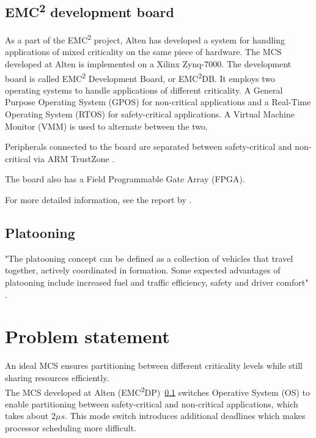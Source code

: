 \subsection{EMC\textsuperscript{2} development board}
\label{sec:mces}
As a part of the EMC\textsuperscript{2} project, Alten has developed a system for handling applications of mixed criticality on the same piece of hardware. The MCS developed at Alten is implemented on a Xilinx Zynq-7000. The development board is called EMC\textsuperscript{2} Development Board, or EMC\textsuperscript{2}DB. It employs two operating systems to handle applications of different criticality. A General Purpose Operating System (GPOS) for non-critical applications and a Real-Time Operating System (RTOS) for safety-critical applications. A Virtual Machine Monitor (VMM) is used to alternate between the two. %

Peripherals connected to the board are separated between safety-critical and non-critical via ARM TrustZone \cite{website:ARM}.

The board also has a Field Programmable Gate Array (FPGA).


For more detailed information, see the report by \cite{zaki2016}.

\subsection{Platooning}
\label{sec:platooning}
"The platooning concept can be defined as a collection of  vehicles that travel together, actively coordinated in formation. Some expected advantages of platooning include increased fuel and traffic  efficiency, safety and driver  comfort" \cite{bergenhem}.

\section{Problem statement}
\label{sec:problem}
An ideal MCS ensures partitioning between different criticality levels while still sharing resources efficiently.\\ %

The MCS developed at Alten (EMC\textsuperscript{2}DP)~\ref{sec:mces} switches Operative System (OS) to enable partitioning between safety-critical and non-critical applications, which takes about 2$\mu s$. This mode switch introduces additional deadlines which makes processor scheduling more difficult.\\ %

